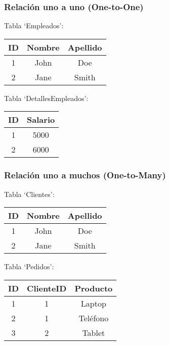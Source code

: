 \documentclass[executivepaper]{article}
\begin{document}
\subsubsection*{Relación uno a uno (One-to-One)}
Tabla \enquote*{Empleados}:
\begin{center}
    \begin{tabular}{|c|c|c|}
    \hline
    \textbf{ID} & \textbf{Nombre} & \textbf{Apellido} \\
    \hline
    1 & John & Doe \\
    \hline
    2 & Jane & Smith \\
    \hline
    \end{tabular}
    \end{center}

Tabla \enquote*{DetallesEmpleados}:
\begin{center}
\begin{tabular}{|c|c|}
\hline
\textbf{ID} & \textbf{Salario} \\
    \hline
    1 & 5000 \\
    \hline
    2 & 6000 \\
    \hline
\end{tabular}
\end{center}

\subsubsection*{Relación uno a muchos (One-to-Many)}
Tabla \enquote*{Clientes}:
\begin{center}
\begin{tabular}{|c|c|c|}
\hline
\textbf{ID} & \textbf{Nombre} & \textbf{Apellido} \\
    \hline
    1 & John & Doe \\
    \hline
    2 & Jane & Smith \\
    \hline
\end{tabular}
\end{center}

Tabla \enquote*{Pedidos}:
\begin{center}
\begin{tabular}{|c|c|c|}
\hline
\textbf{ID} & \textbf{ClienteID} & \textbf{Producto} \\
\hline
1 & 1 & Laptop \\
\hline
2 & 1 & Teléfono \\
\hline
3 & 2 & Tablet \\
\hline
\end{tabular}
\end{center}
\end{document}
